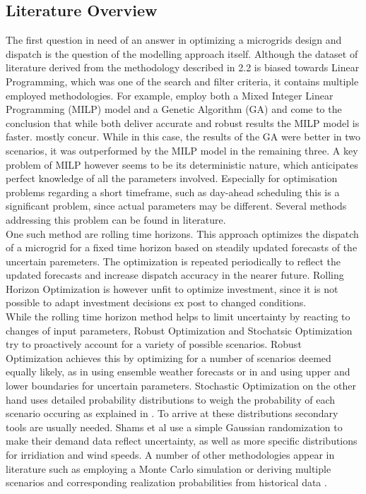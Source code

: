 \documentclass[
	11pt,								%
	DIV10,								%
	a4paper,         					%
	oneside,							%
	headheight=20pt,					%
	footheight=20pt,					%
    parskip=full,						%
    listof=totoc,						%
	bibliography=totoc,					%
	index=totoc,						%
]{scrartcl}
\begin{document}
\subsection{Literature Overview}
The first question in need of an answer in optimizing a microgrids design and dispatch is the question of the modelling approach itself. Although the dataset of literature derived from the methodology described in 2.2 is biased towards Linear Programming, which was one of the search and filter criteria, it contains multiple employed methodologies. For example, \cite{7975049} employ both a Mixed Integer Linear Programming (MILP) model and a Genetic Algorithm (GA) and come to the conclusion that while both deliver accurate and robust results the MILP model is faster. \cite{NEMATI2018944} mostly concur. While in this case, the results of the GA were better in two scenarios, it was outperformed by the MILP model in the remaining three.
A key problem of MILP however seems to be its deterministic nature, which anticipates perfect knowledge of all the parameters involved. Especially for optimisation problems regarding a short timeframe, such as day-ahead scheduling this is a significant problem, since actual parameters may be different. Several methods addressing this problem can be found in literature. 
\\
One such method are rolling time horizons. This approach optimizes the dispatch of a microgrid for a fixed time horizon based on steadily updated forecasts of the uncertain paremeters. The optimization is repeated periodically to reflect the updated forecasts \cite{palma2013microgrid} \cite{silvente2015rolling} and increase dispatch accuracy in the nearer future. Rolling Horizon Optimization is however unfit to optimize investment, since it is not possible to adapt investment decisions ex post to changed conditions.
\\
While the rolling time horizon method helps to limit uncertainty by reacting to changes of input parameters, Robust Optimization and Stochatsic Optimization try to proactively account for a variety of possible scenarios. Robust Optimization achieves this by optimizing for a number of scenarios deemed equally likely, as in \cite{CRAPARO2017135} using ensemble weather forecasts or in \cite{8240914} and \cite{zhang2015optimal} using upper and lower boundaries for uncertain parameters. Stochastic Optimization on the other hand uses detailed probability distributions to weigh the probability of each scenario occuring as explained in \cite{7540870}. To arrive at these distributions secondary tools are usually needed. Shams et al use a simple Gaussian randomization to make their demand data reflect uncertainty, as well as more specific distributions for irridiation and wind speeds. A number of other methodologies appear in literature such as employing a Monte Carlo simulation \cite{ZHENG2018204} or deriving multiple scenarios and corresponding realization probabilities from historical data \cite{7244857}.
\end{document}
